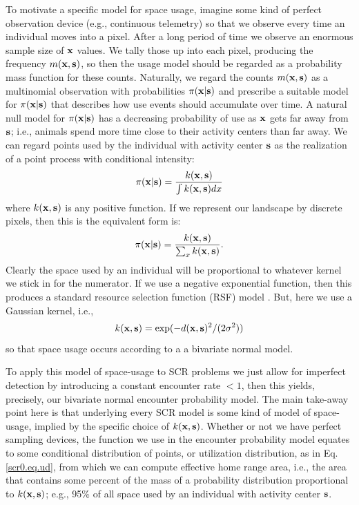 To motivate a specific model for space usage, imagine some kind of
perfect observation device (e.g., continuous telemetry) so that we
observe every time an individual moves into a pixel. After a long
period of time we observe an enormous sample size of ${\bf x}$
values. We tally those up into each pixel, producing the frequency
$m({\bf x},{\bf s})$, so then the usage model should be regarded as a probability
mass function for these counts. Naturally, we regard the counts
$m({\bf x},{\bf s})$
as a multinomial observation with probabilities $\pi({\bf x}|{\bf s})$ and
prescribe a suitable model for $\pi({\bf x}|{\bf s})$ that describes how use
events should accumulate over time. A natural null model for
$\pi({\bf x}|{\bf s})$ has a decreasing probability of use as ${\bf x}$ gets far away
from ${\bf s}$; i.e., animals spend more time close to their activity
centers than far away.  
We can regard points used by the individual
with activity center ${\bf s}$ as the realization of a point process with 
conditional intensity:
\[
\pi({\bf x}|{\bf s}) =  \frac{ k({\bf x},{\bf s}) }{ \int k({\bf
    x},{\bf s}) dx }
\]
where $k({\bf x},{\bf s})$ is any positive function. 
If we represent our landscape by discrete pixels, then this is the
equivalent form is: 
\begin{equation}
\pi({\bf x}|{\bf s}) =  \frac{ k({\bf x},{\bf s}) }{ \sum_{x} k({\bf
    x},{\bf s}) }.
\label{scr0.eq.ud}
\end{equation}
Clearly the space used by an individual will be proportional
to whatever kernel we stick in for the numerator. 
If we use a negative exponential function, then this produces a
standard 
resource selection function (RSF) model
\citep[e.g.,][Ch. 8]{manly_etal:2002}.
But, here we use a Gaussian kernel, i.e., 
\[
 k({\bf x},{\bf s})= \exp(  -d({\bf x},{\bf s})^{2}/(2\sigma^{2})) 
\]
so that space usage occurs according to a a bivariate normal model.

To apply this model of space-usage to SCR problems we just allow for imperfect
detection by introducing a constant encounter rate $<1$, then this
yields, precisely, our bivariate normal encounter probability model.
The main take-away point here is that underlying every SCR model is
some kind of model of space-usage, implied by the 
specific choice of $k({\bf x},{\bf s})$.  
Whether or not we have perfect sampling devices, the function we use
in the encounter probability model equates to some conditional
distribution of points, or utilization distribution, as in
Eq. \ref{scr0.eq.ud}, from which we can compute effective home range
area, i.e., the area that contains some percent of the mass of a
probability distribution proportional to
 $k({\bf x},{\bf
  s})$; e.g.,  95\% of all space used by an individual with activity
center ${\bf s}$.


